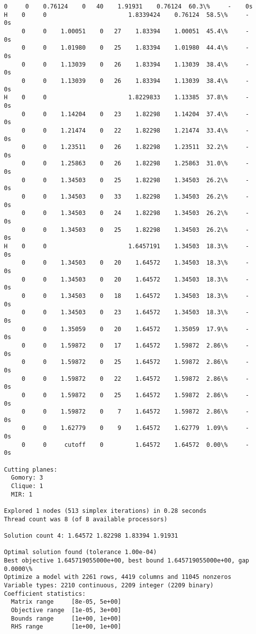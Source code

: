 \documentclass[11pt]{article}
\begin{document}
\begin{Verbatim}[commandchars=\\\{\}]
     0     0    0.76124    0   40    1.91931    0.76124  60.3\%     -    0s
H    0     0                       1.8339424    0.76124  58.5\%     -    0s
     0     0    1.00051    0   27    1.83394    1.00051  45.4\%     -    0s
     0     0    1.01980    0   25    1.83394    1.01980  44.4\%     -    0s
     0     0    1.13039    0   26    1.83394    1.13039  38.4\%     -    0s
     0     0    1.13039    0   26    1.83394    1.13039  38.4\%     -    0s
H    0     0                       1.8229833    1.13385  37.8\%     -    0s
     0     0    1.14204    0   23    1.82298    1.14204  37.4\%     -    0s
     0     0    1.21474    0   22    1.82298    1.21474  33.4\%     -    0s
     0     0    1.23511    0   26    1.82298    1.23511  32.2\%     -    0s
     0     0    1.25863    0   26    1.82298    1.25863  31.0\%     -    0s
     0     0    1.34503    0   25    1.82298    1.34503  26.2\%     -    0s
     0     0    1.34503    0   33    1.82298    1.34503  26.2\%     -    0s
     0     0    1.34503    0   24    1.82298    1.34503  26.2\%     -    0s
     0     0    1.34503    0   25    1.82298    1.34503  26.2\%     -    0s
H    0     0                       1.6457191    1.34503  18.3\%     -    0s
     0     0    1.34503    0   20    1.64572    1.34503  18.3\%     -    0s
     0     0    1.34503    0   20    1.64572    1.34503  18.3\%     -    0s
     0     0    1.34503    0   18    1.64572    1.34503  18.3\%     -    0s
     0     0    1.34503    0   23    1.64572    1.34503  18.3\%     -    0s
     0     0    1.35059    0   20    1.64572    1.35059  17.9\%     -    0s
     0     0    1.59872    0   17    1.64572    1.59872  2.86\%     -    0s
     0     0    1.59872    0   25    1.64572    1.59872  2.86\%     -    0s
     0     0    1.59872    0   22    1.64572    1.59872  2.86\%     -    0s
     0     0    1.59872    0   25    1.64572    1.59872  2.86\%     -    0s
     0     0    1.59872    0    7    1.64572    1.59872  2.86\%     -    0s
     0     0    1.62779    0    9    1.64572    1.62779  1.09\%     -    0s
     0     0     cutoff    0         1.64572    1.64572  0.00\%     -    0s

Cutting planes:
  Gomory: 3
  Clique: 1
  MIR: 1

Explored 1 nodes (513 simplex iterations) in 0.28 seconds
Thread count was 8 (of 8 available processors)

Solution count 4: 1.64572 1.82298 1.83394 1.91931 

Optimal solution found (tolerance 1.00e-04)
Best objective 1.645719055000e+00, best bound 1.645719055000e+00, gap 0.0000\%
Optimize a model with 2261 rows, 4419 columns and 11045 nonzeros
Variable types: 2210 continuous, 2209 integer (2209 binary)
Coefficient statistics:
  Matrix range     [8e-05, 5e+00]
  Objective range  [1e-05, 3e+00]
  Bounds range     [1e+00, 1e+00]
  RHS range        [1e+00, 1e+00]


\end{Verbatim}
\end{document}
